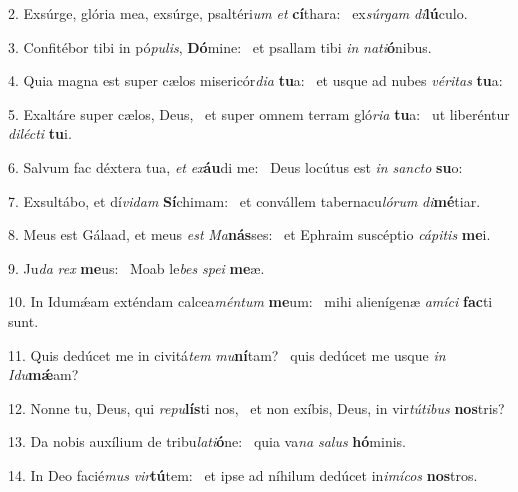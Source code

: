 2. Exsúrge, glória mea, exsúrge, psaltéri\textit{um} \textit{et} \textbf{cí}thara: \ast\  ex\textit{súr}\textit{gam} \textit{di}\textbf{lú}culo.\

3. Confitébor tibi in pó\textit{pu}\textit{lis}, \textbf{Dó}mine: \ast\  et psallam tibi \textit{in} \textit{na}\textit{ti}\textbf{ó}nibus.\

4. Quia magna est super cælos misericór\textit{di}\textit{a} \textbf{tu}a: \ast\  et usque ad nubes \textit{vé}\textit{ri}\textit{tas} \textbf{tu}a:\

5. Exaltáre super cælos, Deus, \dag\  et super omnem terram gló\textit{ri}\textit{a} \textbf{tu}a: \ast\  ut liberéntur \textit{di}\textit{léc}\textit{ti} \textbf{tu}i.\

6. Salvum fac déxtera tua, \textit{et} \textit{ex}\textbf{áu}di me: \ast\  Deus locútus est \textit{in} \textit{sanc}\textit{to} \textbf{su}o:\

7. Exsultábo, et dí\textit{vi}\textit{dam} \textbf{Sí}chimam: \ast\  et convállem tabernacu\textit{ló}\textit{rum} \textit{di}\textbf{mé}tiar.\

8. Meus est Gálaad, et meus \textit{est} \textit{Ma}\textbf{nás}ses: \ast\  et Ephraim suscéptio \textit{cá}\textit{pi}\textit{tis} \textbf{me}i.\

9. Ju\textit{da} \textit{rex} \textbf{me}us: \ast\  Moab le\textit{bes} \textit{spe}\textit{i} \textbf{me}æ.\

10. In Idumǽam exténdam calcea\textit{mén}\textit{tum} \textbf{me}um: \ast\  mihi alienígenæ \textit{a}\textit{mí}\textit{ci} \textbf{fac}ti sunt.\

11. Quis dedúcet me in civitá\textit{tem} \textit{mu}\textbf{ní}tam? \ast\  quis dedúcet me usque \textit{in} \textit{I}\textit{du}\textbf{mǽ}am?\

12. Nonne tu, Deus, qui \textit{re}\textit{pu}\textbf{lís}ti nos, \ast\  et non exíbis, Deus, in vir\textit{tú}\textit{ti}\textit{bus} \textbf{nos}tris?\

13. Da nobis auxílium de tribu\textit{la}\textit{ti}\textbf{ó}ne: \ast\  quia va\textit{na} \textit{sa}\textit{lus} \textbf{hó}minis.\

14. In Deo facié\textit{mus} \textit{vir}\textbf{tú}tem: \ast\  et ipse ad níhilum dedúcet in\textit{i}\textit{mí}\textit{cos} \textbf{nos}tros.\

